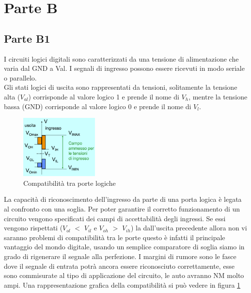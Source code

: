\documentclass[12pt]{article}
\begin{document}
\section{Parte B}
\subsection{Parte B1}\label{b1}
I circuiti logici digitali sono caratterizzati da una tensione di alimentazione che varia dal GND a Val. I segnali di ingresso possono essere ricevuti in modo seriale o parallelo.\\
Gli stati logici di uscita sono rappresentati da tensioni, solitamente la tensione alta ($V_{al}$) corrisponde al valore logico 1 e prende il nome di $V_{h}$, mentre la tensione bassa (GND) corrisponde al valore logico 0 e prende il nome di $V_{l}$.\\

\begin{figure}
  \centering
  \includegraphics[width=0.35\textwidth]{images/compat.png}
  \caption{Compatibilità tra porte logiche}
  \label{fig:compat}
\end{figure}

La capacità di riconoscimento dell’ingresso da parte di una porta logica è legata al confronto con una soglia. Per poter garantire il corretto funzionamento di un circuito vengono specificati dei campi di accettabilità degli ingressi. Se essi vengono rispettati ($V_{ol}$ $<$ $V_{il}$ e $V_{oh}$ $>$ $V_{ih}$) la dall’uscita precedente allora non vi saranno problemi di compatibilità tra le porte questo è infatti il principale vantaggio del mondo digitale, usando un semplice comparatore di soglia siamo in grado di rigenerare il segnale alla perfezione. I margini di rumore sono le fasce dove il segnale di entrata potrà ancora essere riconosciuto correttamente, esse sono commisurate al tipo di applicazione del circuito, le auto avranno NM molto ampi. Una rappresentazione grafica della compatibilità si può vedere in figura \ref{fig:compat}
\end{document}
